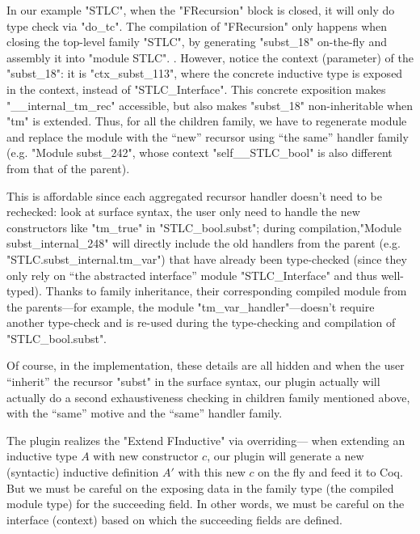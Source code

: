In our example "STLC", when the "FRecursion" block is closed, it will only do type check via "do_tc".  The compilation of "FRecursion"  
only happens when closing the top-level
family "STLC", by generating "subst_18" on-the-fly and assembly it into "module STLC". .
However, notice the context (parameter) of the "subst_18": it is "ctx_subst_113", where the concrete inductive type is exposed in the context, instead of "STLC_Interface". This concrete exposition makes "__internal_tm_rec" accessible, but also makes "subst_18" non-inheritable when "tm" is extended.
Thus, for all the children family, we have to regenerate module and replace the
module with the ``new'' recursor using ``the same'' handler
family (e.g. "Module subst_242", whose context "self__STLC_bool" is also different from that of the parent).

This is affordable since each aggregated recursor handler
doesn't need to be rechecked: look at surface syntax, the user only need to handle the new constructors like "tm_true" in "STLC_bool.subst"; during compilation,"Module subst_internal_248" will directly include the old handlers 
from the parent (e.g. "STLC.subst_internal.tm_var") that have already been type-checked (since they only rely on ``the abstracted interface''
module "STLC_Interface" and thus well-typed). 
Thanks to family inheritance, their corresponding compiled module from the parents---for example, 
the module "tm_var_handler"---doesn't require another type-check and is
re-used during the type-checking and compilation of "STLC_bool.subst".


Of course, in the implementation, these details are all hidden and when the user ``inherit'' the recursor "subst" in the surface syntax,
our plugin actually will actually do a second exhaustiveness
checking in children family mentioned above, with the ``same'' motive and the ``same'' handler family.

The plugin realizes the "Extend FInductive" via overriding---%
when extending an inductive type $A$ with new constructor $c$, our
plugin will generate a new (syntactic) inductive definition $A'$ with
this new $c$ on the fly and feed it to Coq. But we must be careful on
the exposing data in the family type (the compiled module type) for the
succeeding field. In other words, we must be careful on the interface
(context) based on which the succeeding fields are defined.

